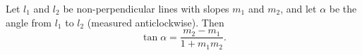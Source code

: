 \begin{theorem}\label{thm:angle-between-lines}
  Let $l_1$ and $l_2$ be non-perpendicular lines with slopes $m_1$ and $m_2$,
  and let $\alpha$ be the angle from $l_1$ to $l_2$ (measured
  anticlockwise). Then
  \[
    \tan \alpha = \frac{m_2 - m_1}{1 + m_1 m_2}.
  \]
\end{theorem}

